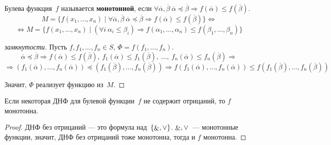  Булева функция~$f$ называется \textbf{монотонной}, если
$\forall \overline\alpha, \overline\beta \
\overline\alpha \preccurlyeq \overline\beta \Rightarrow f(\overline\alpha) \leqslant f(\overline\beta)$.
\begin{equation*}
M = \{ f(x_1, \ldots, x_n) \mid
\forall \overline\alpha, \overline\beta \
\overline\alpha \preccurlyeq \overline\beta \Rightarrow f(\overline\alpha) \leqslant f(\overline\beta) \} \Leftrightarrow
\end{equation*}
\begin{equation*}
\Leftrightarrow M = \{ f(x_1, \ldots, x_n) \mid
(\forall i \ \alpha_i \leqslant \beta_i) \Rightarrow f(\alpha_1, \ldots, \alpha_n) \leqslant f(\beta_1, \ldots, \beta_n) \}
\end{equation*}
\begin{proof}[замкнутости]
Пусть $f, f_1, \ldots, f_n \in S$, $\Phi = f(f_1, \ldots, f_n)$.
\begin{equation*}
\overline\alpha \preccurlyeq \overline\beta \Rightarrow
f(\overline\alpha) \leqslant f(\overline\beta), \
f_1(\overline\alpha) \leqslant f_1(\overline\beta), \ \ldots, \
f_n(\overline\alpha) \leqslant f_n(\overline\beta) \Rightarrow
\end{equation*}
\begin{equation*}
\Rightarrow (f_1(\overline\alpha), \ldots, f_n(\overline\alpha)) \preccurlyeq (f_1(\overline\beta), \ldots, f_n(\overline\beta)) \Rightarrow
f(f_1(\overline\alpha), \ldots, f_n(\overline\alpha)) \leqslant f(f_1(\overline\beta), \ldots, f_n(\overline\beta))
\end{equation*}

Значит, $\Phi$ реализует функцию из~$M$.
\end{proof}

\begin{consequent}
Если некоторая ДНФ для булевой функции~$f$ не содержит отрицаний, то $f$ монотонна.
\end{consequent}
\begin{proof}
ДНФ без отрицаний — это формула над~$\{ \mathop{\&}, \lor \}$.
$\mathop{\&}, \lor$~--- монотонные функции, значит, ДНФ без отрицаний тоже монотонна, тогда и $f$ монотонна.
\end{proof}

